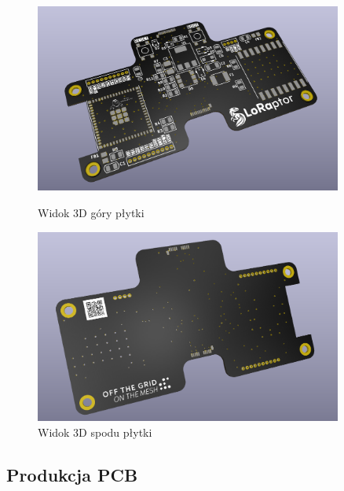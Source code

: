 \begin{figure}[htbp]
\centering
	\includegraphics[width=0.9\textwidth]{root/pcb_render_top.png}
	\caption{Widok 3D góry płytki}
	\vspace{1cm}
	\includegraphics[width=0.9\textwidth]{root/pcb_render_bottom.png}
	\caption{Widok 3D spodu płytki}
\end{figure}
	
\clearpage
\subsection{Produkcja PCB}

